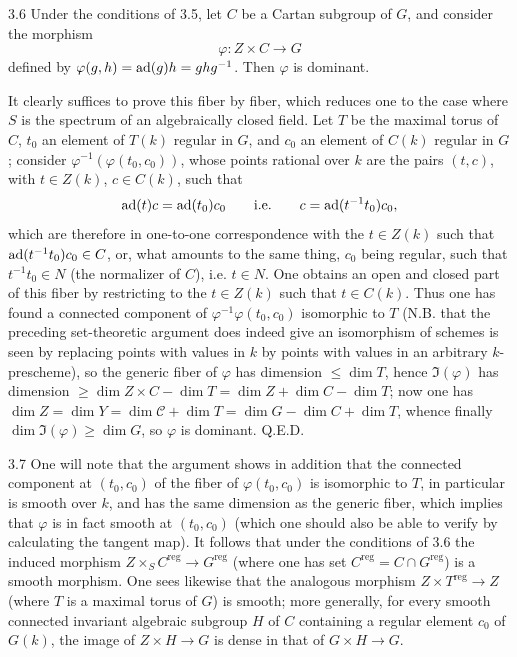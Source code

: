 \begin{corollary}{3.6}\label{XIII.3.6}
Under the conditions of 3.5, let $C$ be a Cartan subgroup of $G$,
and consider the morphism
\[
 \varphi:Z\times C\to G
\]
defined by $\varphi(g,h)=\operatorname{ad}(g)h=ghg^{-1}$. Then $\varphi$ is dominant.
\end{corollary}
It clearly suffices to prove this fiber by fiber, which reduces one
to the case where $S$ is the spectrum of an algebraically closed field.
Let $T$ be the maximal torus of $C$, $t_0$ an element of $T(k)$ regular
in $G$, and $c_0$ an element of $C(k)$ regular in $G$; consider
$\varphi^{-1}(\varphi(t_0,c_0))$, whose points rational over $k$ are the
pairs $(t,c)$, with $t\in Z(k)$, $c\in C(k)$, such that
\[
 \operatorname{ad}(t)c=\operatorname{ad}(t_0)c_0\qquad\text{i.e.}\qquad c=\operatorname{ad}(t^{-1}t_0)c_0,
\]
which are therefore in one-to-one correspondence with the $t\in Z(k)$
such that $\operatorname{ad}(t^{-1}t_0)c_0\in C$, or, what amounts to the same thing,
$c_0$ being regular, such that $t^{-1}t_0\in N$ (the normalizer of $C$),
i.e. $t\in N$. One obtains an open and closed part of this fiber by
restricting to the $t\in Z(k)$ such that $t\in C(k)$. Thus one has
found a connected component of $\varphi^{-1}\varphi(t_0,c_0)$ isomorphic
to $T$ (N.B. that the preceding set-theoretic argument does indeed give
an isomorphism of schemes is seen by replacing points with values in
$k$ by points with values in an arbitrary $k$-prescheme), so the generic
fiber of $\varphi$ has dimension $\leq\dim T$, hence $\Im(\varphi)$ has
dimension $\geq\dim Z\times C-\dim T=\dim Z+\dim C-\dim T$; now one has
$\dim Z=\dim Y=\dim\mathcal C+\dim T=\dim G-\dim C+\dim T$, whence
finally $\dim\Im(\varphi)\geq\dim G$, so $\varphi$ is dominant.
\hfill Q.E.D.

\begin{remarks}{3.7}\label{XIII.3.7}
One will note that the argument shows in addition that the connected
component at $(t_0,c_0)$ of the fiber of $\varphi(t_0,c_0)$ is isomorphic
to $T$, in particular is smooth over $k$, and has the same dimension
as the generic fiber, which implies that $\varphi$ is in fact smooth
at $(t_0,c_0)$ (which one should also be able to verify by calculating
the tangent map). It follows that under the conditions of 3.6 the
induced morphism $Z\times_S C^{\mathrm{reg}}\to G^{\mathrm{reg}}$ (where
one has set $C^{\mathrm{reg}}=C\cap G^{\mathrm{reg}}$) is a smooth morphism.
One sees likewise that the analogous morphism
$Z\times T^{\mathrm{reg}}\to Z$ (where $T$ is a maximal torus of $G$)
is smooth; more generally, for every smooth connected invariant
algebraic subgroup $H$ of $C$ containing a regular element $c_0$ of
$G(k)$, the image of $Z\times H\to G$ is dense in that of $G\times H\to G$.
\end{remarks}


